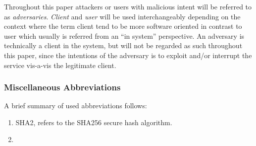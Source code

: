 Throughout this paper attackers or users with malicious intent will be referred to as \emph{adversaries}.
\emph{Client} and \emph{user} will be used interchangeably depending on the context where the term client tend to be more software oriented in contrast to user which usually is referred from an ``in system'' perspective.
An adversary is technically a client in the system, but will not be regarded as such throughout this paper, since the intentions of the adversary is to exploit and/or interrupt the service vis-a-vis the legitimate client. 

\subsubsection{Miscellaneous Abbreviations}
A brief summary of used abbreviations follows:
\begin{enumerate}
\item SHA2, refers to the SHA256 secure hash algorithm\cite{sha2}.
\item 
\end{enumerate}